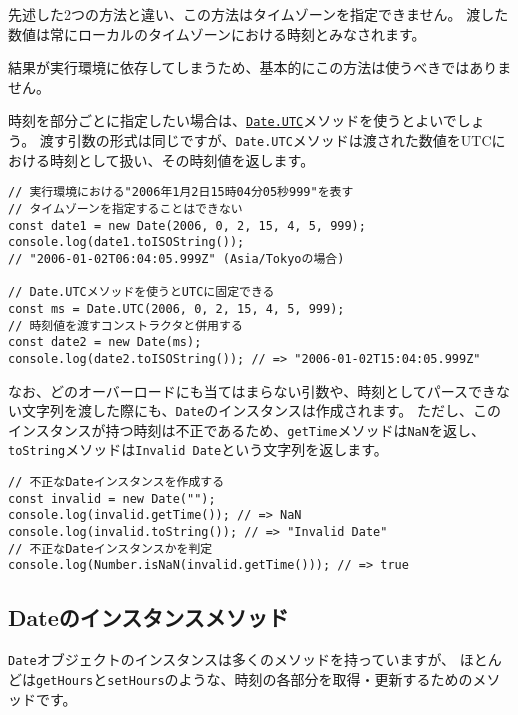 先述した2つの方法と違い、この方法はタイムゾーンを指定できません。
渡した数値は常にローカルのタイムゾーンにおける時刻とみなされます。

結果が実行環境に依存してしまうため、基本的にこの方法は使うべきではありません。

時刻を部分ごとに指定したい場合は、\href{https://developer.mozilla.org/ja/docs/Web/JavaScript/Reference/Global_Objects/Date/UTC}{\texttt{Date.UTC}}メソッドを使うとよいでしょう。
渡す引数の形式は同じですが、\texttt{Date.UTC}メソッドは渡された数値をUTCにおける時刻として扱い、その時刻値を返します。

\begin{lstlisting}
// 実行環境における"2006年1月2日15時04分05秒999"を表す
// タイムゾーンを指定することはできない
const date1 = new Date(2006, 0, 2, 15, 4, 5, 999);
console.log(date1.toISOString()); 
// "2006-01-02T06:04:05.999Z" (Asia/Tokyoの場合)

// Date.UTCメソッドを使うとUTCに固定できる
const ms = Date.UTC(2006, 0, 2, 15, 4, 5, 999);
// 時刻値を渡すコンストラクタと併用する
const date2 = new Date(ms);
console.log(date2.toISOString()); // => "2006-01-02T15:04:05.999Z"
\end{lstlisting}

なお、どのオーバーロードにも当てはまらない引数や、時刻としてパースできない文字列を渡した際にも、\texttt{Date}のインスタンスは作成されます。
ただし、このインスタンスが持つ時刻は不正であるため、\texttt{getTime}メソッドは\texttt{NaN}を返し、\texttt{toString}メソッドは\texttt{Invalid Date}という文字列を返します。

\begin{lstlisting}
// 不正なDateインスタンスを作成する
const invalid = new Date("");
console.log(invalid.getTime()); // => NaN
console.log(invalid.toString()); // => "Invalid Date"
// 不正なDateインスタンスかを判定
console.log(Number.isNaN(invalid.getTime())); // => true
\end{lstlisting}

\hypertarget{instance-method}{%
\subsection{Dateのインスタンスメソッド}\label{instance-method}}

\texttt{Date}オブジェクトのインスタンスは多くのメソッドを持っていますが、
ほとんどは\texttt{getHours}と\texttt{setHours}のような、時刻の各部分を取得・更新するためのメソッドです。

